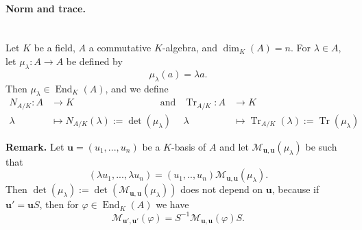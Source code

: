 \documentclass[12pt,a4paper]{report}
\theoremstyle{definition}
\theoremstyle{num.custom-title}
\DeclareMathOperator{\End}{End}
\DeclareMathOperator{\Tr}{Tr}
\newcommand{\M}{\mathcal{M}}
\renewcommand{\phi}{\varphi}
\renewcommand{\u}{\mathbf{u}}
\begin{document}
\paragraph{Norm and trace.}\ \\
Let $K$ be a field, $A$ a commutative $K$-algebra, and $\dim_K(A)=n$. For $\lambda \in A$, let $\mu_\lambda : A \to A$ be defined by
\[
\mu_\lambda(a) = \lambda a.
\]
Then $\mu_\lambda \in \End_K(A)$, and we define
\begin{align*}
N_{A/K} \colon A &\to K \quad \quad \quad \quad \quad \quad \quad \quad \quad \text{and}  &\Tr_{A/K} \colon A &\to K \\
\lambda &\mapsto N_{A/K}(\lambda) := \det(\mu_\lambda)    &\lambda &\mapsto \Tr_{A/K}(\lambda) := \Tr(\mu_\lambda)
\end{align*}

\noindent\textbf{Remark.} Let $\u = (u_1,...,u_n)$ be a $K$-basis of $A$ and let $\M_{\u,\u}(\mu_\lambda)$ be such that
\[
(\lambda u_1, ..., \lambda u_n) = (u_1,..,u_n) \M_{\u,\u}(\mu_\lambda).
\]
Then $\det(\mu_\lambda) := \det(\M_{\u,\u}(\mu_\lambda))$ does not depend on $\u$, because if $\u'=\u S$, then for $\phi \in \End_K(A)$ we have
\[
\M_{\u',\u'}(\phi) = S^{-1} \M_{\u,\u}(\phi) S.
\]
\end{document}
